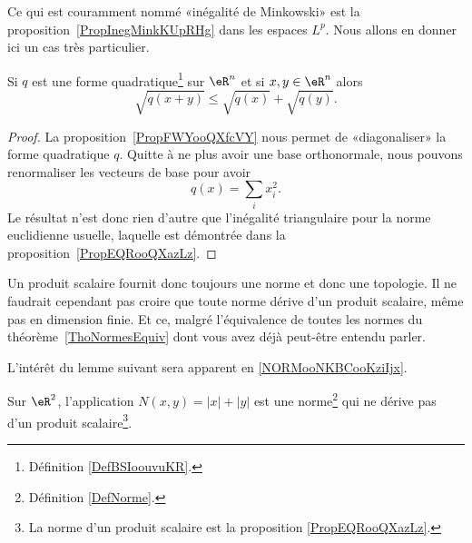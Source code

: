 Ce qui est couramment nommé «inégalité de Minkowski» est la proposition~\ref{PropInegMinkKUpRHg} dans les espaces \( L^p\). Nous allons en donner ici un cas très particulier.

\begin{proposition} \label{PropACHooLtsMUL}
    Si \( q\) est une forme quadratique\footnote{Définition \ref{DefBSIoouvuKR}.} sur \( \eR^n\) et si \( x,y\in \eR^n\) alors
    \begin{equation}
        \sqrt{q(x+y)}\leq\sqrt{q(x)}+\sqrt{q(y)}.
    \end{equation}
\end{proposition}

\begin{proof}
    La proposition~\ref{PropFWYooQXfcVY} nous permet de «diagonaliser» la forme quadratique \( q\). Quitte à ne plus avoir une base orthonormale, nous pouvons renormaliser les vecteurs de base pour avoir
    \begin{equation}
        q(x)=\sum_ix_i^2.
    \end{equation}
    Le résultat n'est donc rien d'autre que l'inégalité triangulaire pour la norme euclidienne usuelle, laquelle est démontrée dans la proposition~\ref{PropEQRooQXazLz}.
\end{proof}


\begin{normaltext}
    Un produit scalaire fournit donc toujours une norme et donc une topologie. Il ne faudrait cependant pas croire que toute norme dérive d'un produit scalaire, même pas en dimension finie. Et ce, malgré l'équivalence de toutes les normes du théorème~\ref{ThoNormesEquiv} dont vous avez déjà peut-être entendu parler.
\end{normaltext}


L'intérêt du lemme suivant sera apparent en \ref{NORMooNKBCooKziIjx}.
\begin{lemma}   \label{LEMooRWJYooOIJkZc}
    Sur \( \eR^2\), l'application \( N(x,y)=| x |+| y |\) est une norme\footnote{Définition \ref{DefNorme}.} qui ne dérive pas d'un produit scalaire\footnote{La norme d'un produit scalaire est la proposition  \ref{PropEQRooQXazLz}.}.
\end{lemma}

